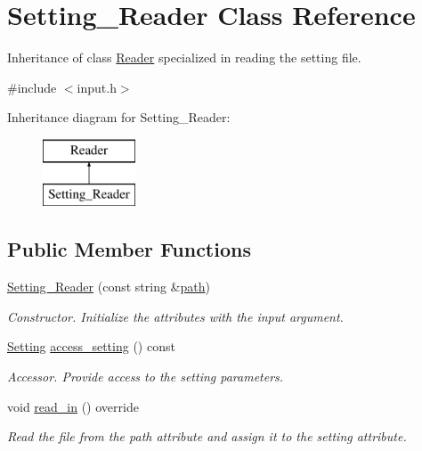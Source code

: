 \hypertarget{class_setting___reader}{}\section{Setting\+\_\+\+Reader Class Reference}
\label{class_setting___reader}


Inheritance of class \mbox{\hyperlink{class_reader}{Reader}} specialized in reading the setting file.  




{\ttfamily \#include $<$input.\+h$>$}

Inheritance diagram for Setting\+\_\+\+Reader\+:\begin{figure}[H]
\begin{center}
\leavevmode
\includegraphics[height=2.000000cm]{class_setting___reader}
\end{center}
\end{figure}
\subsection*{Public Member Functions}
\begin{DoxyCompactItemize}
\item 
\mbox{\label{class_setting___reader_a604a6eaadd0d39eb3d6b4ae768b95364}} 
\mbox{\hyperlink{class_setting___reader_a604a6eaadd0d39eb3d6b4ae768b95364}{Setting\+\_\+\+Reader}} (const string \&\mbox{\hyperlink{class_reader_a4f3eaccb117f248d4649ffb4e793a23d}{path}})
\begin{DoxyCompactList}\small\item\em Constructor. Initialize the attributes with the input argument. \end{DoxyCompactList}\item 
\mbox{\label{class_setting___reader_a473c6649c848b28d53ebe99acb6f1c0f}} 
\mbox{\hyperlink{struct_setting}{Setting}} \mbox{\hyperlink{class_setting___reader_a473c6649c848b28d53ebe99acb6f1c0f}{access\+\_\+setting}} () const
\begin{DoxyCompactList}\small\item\em Accessor. Provide access to the setting parameters. \end{DoxyCompactList}\item 
\mbox{\label{class_setting___reader_a32f8f22c9ef67f4ab3f61f9cb5da69b3}} 
void \mbox{\hyperlink{class_setting___reader_a32f8f22c9ef67f4ab3f61f9cb5da69b3}{read\+\_\+in}} () override
\begin{DoxyCompactList}\small\item\em Read the file from the path attribute and assign it to the setting attribute. \end{DoxyCompactList}\end{DoxyCompactItemize}
